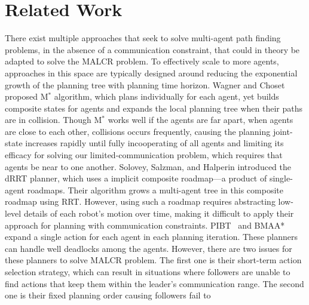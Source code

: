 \documentclass[letterpaper, 10 pt, conference]{ieeeconf}  %
\begin{document}
\section{Related Work} \label{sec:related-work}

There exist multiple approaches that seek to solve multi-agent path finding problems, 
in the absence of a communication constraint, that could in theory be adapted to solve the MALCR problem.
To effectively scale to more agents, approaches in this space are typically designed around 
reducing the exponential growth of the planning tree with planning time horizon.
Wagner and Choset \cite{wagner2015subdimensional} proposed M$^*$ algorithm, which plans individually 
for each agent, yet builds composite states for agents and expands the local planning tree when their paths are in collision.
Though M$^*$ works well if the agents are far apart, when agents are close to each other, 
collisions occurs frequently, causing the planning joint-state increases rapidly until fully incooperating of all agents and limiting 
its efficacy for solving our limited-communication problem, which requires that agents be near to one another. 
Solovey, Salzman, and Halperin \cite{solovey2016finding} introduced the dRRT planner, which uses 
a implicit composite roadmap---a product of single-agent roadmaps. Their algorithm grows a multi-agent 
tree in this composite roadmap using RRT. However, using such a roadmap requires abstracting low-level 
details of each robot's motion over time, making it difficult to apply their approach for planning with communication constraints.
PIBT~\cite{okumura2022priority} and BMAA*~\cite{sigurdson2018multi} expand a single action for each agent 
in each planning iteration. These planners can handle well deadlocks among the agents. However, 
there are two issues for these planners to solve MALCR problem. The first one is their short-term action 
selection strategy, which can result in situations where followers are unable to find actions that keep them 
within the leader's communication range. The second one is their fixed planning order causing followers fail to 
\end{document}
